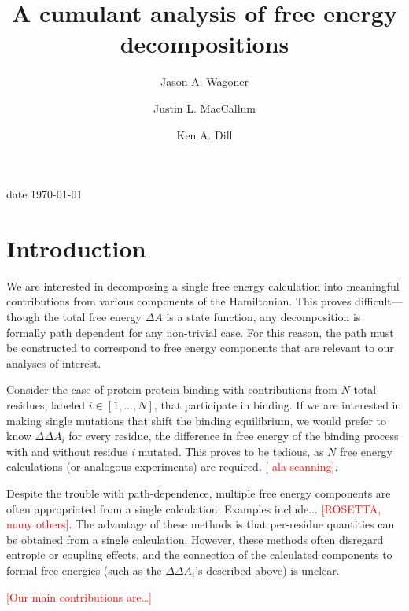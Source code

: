 \documentclass[%
 preprint,
 amsmath,amssymb,
 aps,
]{revtex4-1}
\newcommand{\warning}[1]{{\textsf{{\textcolor{red}{{[#1]}{}}}}}}
\begin{document}
\title{A cumulant analysis of free energy decompositions}
\author{Jason A. Wagoner}
\author{Justin L. MacCallum}
\author{Ken A. Dill}

date{ \today}


\begin{abstract}

\end{abstract}

\maketitle

\section{Introduction}

We are interested in decomposing a single free energy calculation into meaningful contributions from various components of  the Hamiltonian.  This proves difficult---though the total free energy $\Delta A$ is a state function, any decomposition is formally path dependent for any non-trivial case.  For this reason, the path must be constructed to correspond to free energy components that are relevant to our analyses of interest.

Consider the case of protein-protein binding with contributions from $N$ total residues, labeled $i\in \left[ 1, \dots, N\right]$, that participate in binding.  If we are interested in making single mutations that shift the binding equilibrium, we would prefer to know $\Delta \Delta A_i$ for every residue, 
the difference in free energy of the binding process with and without residue \textit{i} mutated.   This proves to be tedious, as $N$ free energy calculations (or analogous experiments) are required.   \warning{ ala-scanning}.  

Despite the trouble with path-dependence, multiple free energy components are often appropriated from a single calculation.  Examples include... \warning{ROSETTA, many others}.  The advantage of these methods is that per-residue quantities can be obtained from a single calculation. However, these methods often disregard entropic or coupling effects, and the connection of the calculated components to formal free energies (such as the $\Delta \Delta A_i$'s described above) is unclear.  

\warning{Our main contributions are\dots}
\end{document}
